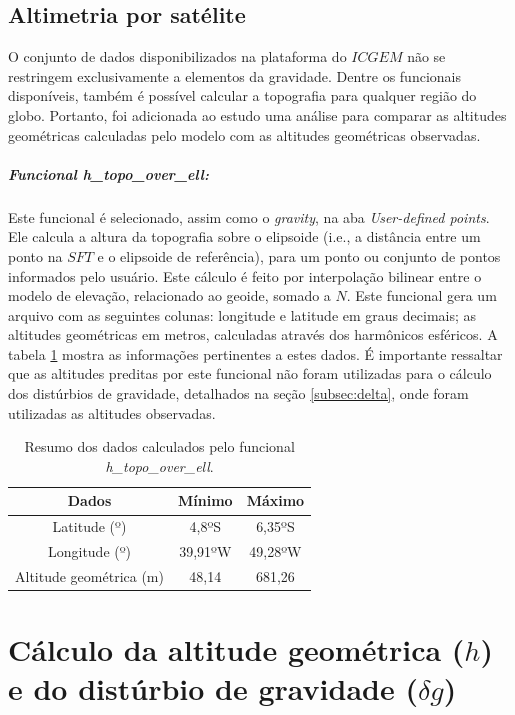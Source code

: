 \subsection{Altimetria por satélite}
O conjunto de dados disponibilizados na plataforma do $ICGEM$ não se restringem exclusivamente a elementos da gravidade. Dentre os funcionais disponíveis, também é possível calcular a topografia para qualquer região do globo. Portanto, foi adicionada ao estudo uma análise para comparar as altitudes  geométricas calculadas pelo modelo com as altitudes geométricas observadas. 
\subparagraph{Funcional \textit{h\_topo\_over\_ell}:} Este funcional é selecionado, assim como o \textit{gravity}, na aba \textit{User-defined points}. Ele calcula a altura da topografia sobre o elipsoide (i.e., a distância entre um ponto na $SFT$ e o elipsoide de referência), para um ponto ou conjunto de pontos informados pelo usuário. Este cálculo é feito por interpolação bilinear entre o modelo de elevação, relacionado ao geoide, somado a $N$. Este funcional gera um arquivo com as seguintes colunas: longitude e latitude em graus decimais; as altitudes geométricas em metros, calculadas através dos harmônicos esféricos. A tabela \ref{tab:dados_h_pred} mostra as informações pertinentes a estes dados. É importante ressaltar que as altitudes preditas por este funcional não foram utilizadas para o cálculo dos distúrbios de gravidade, detalhados na seção \ref{subsec:delta}, onde foram utilizadas as altitudes observadas. 

\begin{table}[H]
	\centering
	\caption{Resumo dos dados calculados pelo funcional \textit{h\_topo\_over\_ell}.}
	\label{tab:dados_h_pred}
	\begin{tabular}{c|c|c}
		
		Dados & Mínimo & Máximo  \\ %
		\hline                               %
		Latitude (º) & 4,8ºS & 6,35ºS \\
		Longitude (º) & 39,91ºW & 49,28ºW \\
		Altitude geométrica (m) & 48,14 & 681,26
	\end{tabular}
\end{table}

\section{Cálculo da altitude geométrica ($h$) e do distúrbio de gravidade ($\delta g$)}

